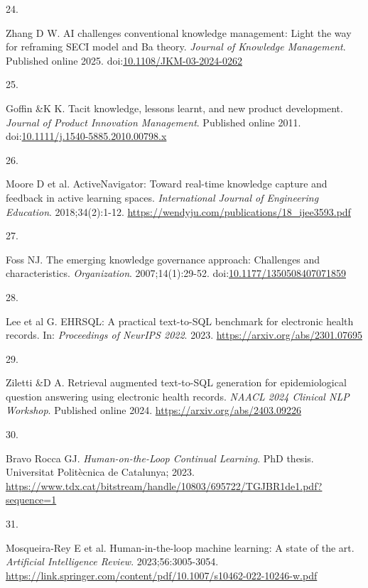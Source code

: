 \documentclass[
  american,
  11pt,
  letterpaper,
  oneside  ,captions=tableheading
]{scrartcl}
\newlength{\cslhangindent}
\newlength{\csllabelwidth}
\newenvironment{CSLReferences}[2] %
 {\begin{list}{}{%
  \setlength{\itemindent}{0pt}
  \setlength{\leftmargin}{0pt}
  \setlength{\parsep}{0pt}
  \ifodd #1
   \setlength{\leftmargin}{\cslhangindent}
   \setlength{\itemindent}{-1\cslhangindent}
  \fi
  \setlength{\itemsep}{#2\baselineskip}}}
 {\end{list}}
\newcommand{\CSLLeftMargin}[1]{\parbox[t]{\csllabelwidth}{\strut#1\strut}}
\newcommand{\CSLRightInline}[1]{\parbox[t]{\linewidth - \csllabelwidth}{\strut#1\strut}}
\begin{document}
\begin{CSLReferences}{0}{1}
\CSLLeftMargin{24. }%
\CSLRightInline{Zhang D W. {{AI} challenges conventional knowledge
management: Light the way for reframing {SECI} model and Ba theory}.
\emph{Journal of Knowledge Management}. Published online 2025.
doi:\href{https://doi.org/10.1108/JKM-03-2024-0262}{10.1108/JKM-03-2024-0262}}

\CSLLeftMargin{25. }%
\CSLRightInline{Goffin \&K K. {Tacit knowledge, lessons learnt, and new
product development}. \emph{Journal of Product Innovation Management}.
Published online 2011.
doi:\href{https://doi.org/10.1111/j.1540-5885.2010.00798.x}{10.1111/j.1540-5885.2010.00798.x}}

\CSLLeftMargin{26. }%
\CSLRightInline{{Moore D et al.} {ActiveNavigator: Toward real-time
knowledge capture and feedback in active learning spaces}.
\emph{International Journal of Engineering Education}. 2018;34(2):1-12.
\url{https://wendyju.com/publications/18_ijee3593.pdf}}

\CSLLeftMargin{27. }%
\CSLRightInline{Foss NJ. {The emerging knowledge governance approach:
Challenges and characteristics}. \emph{Organization}. 2007;14(1):29-52.
doi:\href{https://doi.org/10.1177/1350508407071859}{10.1177/1350508407071859}}

\CSLLeftMargin{28. }%
\CSLRightInline{{Lee et al G.} {EHRSQL: A practical text-to-SQL
benchmark for electronic health records}. In: \emph{Proceedings of
NeurIPS 2022}. 2023. \url{https://arxiv.org/abs/2301.07695}}

\CSLLeftMargin{29. }%
\CSLRightInline{Ziletti \&D A. {Retrieval augmented text-to-SQL
generation for epidemiological question answering using electronic
health records}. \emph{{NAACL} 2024 Clinical {NLP} Workshop}. Published
online 2024. \url{https://arxiv.org/abs/2403.09226}}

\CSLLeftMargin{30. }%
\CSLRightInline{Bravo Rocca GJ. \emph{Human-on-the-Loop Continual
Learning}. PhD thesis. Universitat Polit{è}cnica de Catalunya; 2023.
\url{https://www.tdx.cat/bitstream/handle/10803/695722/TGJBR1de1.pdf?sequence=1}}

\CSLLeftMargin{31. }%
\CSLRightInline{{Mosqueira-Rey E et al.} Human-in-the-loop machine
learning: A state of the art. \emph{Artificial Intelligence Review}.
2023;56:3005-3054.
\url{https://link.springer.com/content/pdf/10.1007/s10462-022-10246-w.pdf}}


\end{CSLReferences}
\end{document}
